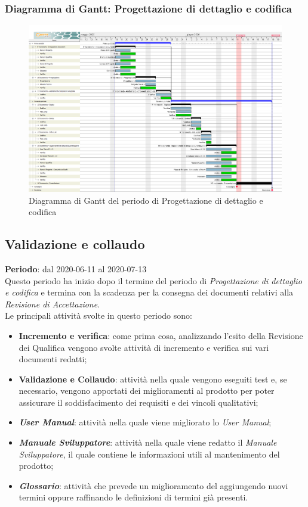 	\subsubsection{Diagramma di Gantt: Progettazione di dettaglio e codifica}
		\begin{figure}[h]
			\centering
			\includegraphics[width=1.1\textwidth]{./res/img/DiagrammiGantt/prog_dett_gantt.png}
			\caption{Diagramma di Gantt del periodo di Progettazione di dettaglio e codifica}
		\end{figure}
\newpage
\subsection{Validazione e collaudo}
\textbf{Periodo}: dal 2020-06-11 al 2020-07-13 \\
Questo periodo ha inizio dopo il termine del periodo di \textit{Progettazione di dettaglio e codifica} e termina con la scadenza per la consegna dei documenti relativi alla \textit{Revisione di Accettazione}. \\
Le principali attività svolte in questo periodo sono:
\begin{itemize}
	\item \textbf{Incremento e verifica}: come prima cosa, analizzando l'esito della Revisione dei Qualifica vengono svolte attività di incremento e verifica sui vari documenti redatti;
	\item \textbf{Validazione e Collaudo}: attività nella quale vengono eseguiti test e, se necessario, vengono apportati dei miglioramenti al prodotto per poter assicurare il soddisfacimento dei requisiti e dei vincoli qualitativi;
	\item \textbf{\textit{User Manual}}: attività nella quale viene migliorato lo \textit{User Manual};
	\item \textbf{\textit{Manuale Sviluppatore}}: attività nella quale viene redatto il \textit{Manuale Sviluppatore}, il quale contiene le informazioni utili al mantenimento del prodotto;
	\item \textbf{\textit{Glossario}}: attività che prevede un miglioramento del \Glossario aggiungendo nuovi termini oppure raffinando le definizioni di termini già presenti.
\end{itemize}

